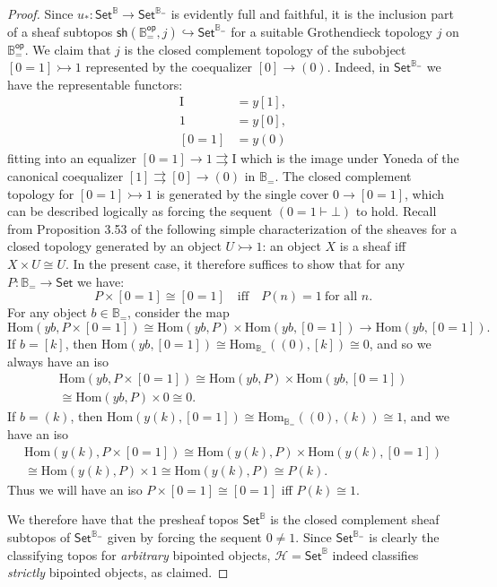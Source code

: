 \documentclass[11pt]{article}
\newcommand{\B}{\ensuremath{\mathbb{B}}}
\newcommand{\Set}{\ensuremath{\mathsf{Set}}}
\renewcommand{\hom}{\ensuremath{\mathrm{Hom}}}
\newcommand{\hook}{\ensuremath{\hookrightarrow}}
\newcommand{\mono}{\ensuremath{\rightarrowtail}}
\newcommand{\I}{\ensuremath{\mathrm{I}}}
\newcommand{\HH}{\ensuremath{\mathcal{H}}}
\theoremstyle{remark}
\theoremstyle{definition}
\begin{document}
\begin{proof}
Since $u_* : \Set^{\B} \to \Set^{\B_=}$ is evidently full and faithful, it is the inclusion part of a sheaf subtopos $\mathsf{sh}(\B^\mathsf{op}_=, j) \hook \Set^{\B_=}$ for a suitable Grothendieck topology $j$ on $\B^\mathsf{op}_=$.  We claim that $j$ is the closed complement topology of the subobject $[0=1] \rightarrowtail 1$ represented by the coequalizer $[0]\to (0)$.  Indeed, in $\Set^{\B_=}$ we have the representable functors:
\begin{align*}
\I &= y[1],\\
1 &= y[0],\\
[0=1] &= y(0)
\end{align*}
fitting into an equalizer $[0=1] \to 1 \rightrightarrows \I$ which is the image under Yoneda of the canonical coequalizer $[1] \rightrightarrows [0]\to (0)$ in $\B_=$.  The closed complement topology for $[0=1] \mono 1$ is generated by the single cover $0\to [0=1]$, which can be described logically as 
forcing the sequent $(0=1 \vdash \bot)$ to hold.  Recall from Proposition 3.53 of \cite{JohnstoneTT} the following simple characterization of the sheaves for a closed topology generated by an object $U\mono 1$: an object $X$ is a sheaf iff $X\times U \cong U$. In the present case, it therefore suffices to show that for any $P:\B_= \to \Set$ we have:
\[
P\times [0=1] \cong [0=1] \quad\text{iff}\quad P(n) = 1\ \text{for all $n$}.
\]
For any object $b\in \B_=$, consider the map
\[
\hom(yb, P\times [0=1] ) \cong \hom(yb, P) \times \hom(yb, [0=1]) \to \hom(yb, [0=1]) .
\]
If $b = [k]$, then $\hom(yb, [0=1]) \cong \hom_{\B_=}((0), [k]) \cong 0$, and so we always have an iso
\[
\begin{split}
\hom(yb, P\times [0=1] ) \cong \hom(yb, P) \times \hom(yb, [0=1])\\
 \cong \hom(yb, P) \times 0 \cong 0.
 \end{split}
\]
If $b = (k)$, then $\hom(y(k), [0=1]) \cong \hom_{\B_=}((0), (k)) \cong 1$, and we have an iso
\[
\begin{split}
\hom(y(k), P\times [0=1] ) \cong \hom(y(k), P) \times \hom(y(k), [0=1]) \\
\cong \hom(y(k), P) \times 1 \cong \hom(y(k), P) \cong P(k).
\end{split}
\]
Thus we will have an iso $P\times [0=1] \cong [0=1] $ iff $P(k) \cong 1$.

We therefore have that the presheaf topos $\Set^\B$ is the closed complement sheaf subtopos of $\Set^{\B_=}$ given by forcing the sequent $0\neq 1$.  Since $\Set^{\B_=}$ is clearly the classifying topos for \emph{arbitrary} bipointed objects, $\HH = \Set^\B$ indeed classifies \emph{strictly} bipointed objects, as claimed.
\end{proof}
\end{document}
